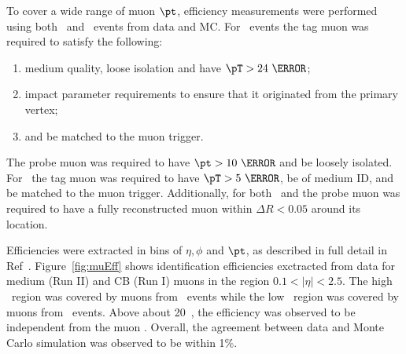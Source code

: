 \par To cover a wide range of muon $\pt$, efficiency measurements were performed using both 
\Jmm\ and \Zmm\ events from data and MC. 
For \Zmm\ events the tag muon was required to satisfy the following:
\begin{enumerate}
\item medium quality, loose isolation and have $\pT>24~\GeV$; 
\item impact parameter requirements to ensure that it originated from the primary vertex;
\item and be matched to the muon trigger. 
\end{enumerate}
The probe muon was required to have $\pt>10~\GeV$ and be loosely isolated. 
For \Jmm\ the tag muon was required to have $\pT>5~\GeV$, be of medium ID, and be 
matched to the muon trigger. Additionally, for both \Jmm\ and \Zmm the probe muon
was required to have a fully reconstructed muon within $\Delta R< 0.05$ around its location. 

\par Efficiencies were extracted in bins of $\eta,\phi$ and $\pt$, as described in full detail in 
Ref~\cite{Aad:2016jkr}. Figure~\ref{fig:muEff} shows identification efficiencies exctracted from data 
for medium (Run II) and CB (Run I) muons in the region $0.1<|\eta|<2.5$. The high \pt\ region was 
covered by muons from \Zmm\ events while the low \pt\ region was covered by muons 
from \Jmm\ events. Above about 20~\GeV, the efficiency was observed to be independent from 
the muon \pt. Overall, the agreement between data and Monte Carlo simulation was observed 
to be within 1\%.    

